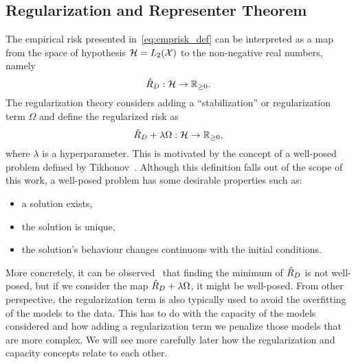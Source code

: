 \subsection{Regularization and Representer Theorem} %
The empirical risk presented in~\eqref{eq:emprisk_def} can be interpreted as a map from the space of hypothesis $\mathcal{H} = L_2(\mathcal{X})$ to the non-negative real numbers, namely
$$ \hat{R}_{D}: \mathcal{H} \to \mathbb{R}_{\geq 0} .$$
%
The regularization theory considers adding a ``stabilization'' or regularization term $\Omega$ and define the regularized risk as
$$ \hat{R}_{D} + \lambda \Omega: \mathcal{H} \to \mathbb{R}_{\geq 0} ,$$
where $\lambda$ is a hyperparameter.
This is motivated by the concept of a well-posed problem defined by Tikhonov~\citep{ScholkopfS02}. Although this definition falls out of the scope of this work, a well-posed problem has some desirable properties such as:
\begin{itemize}
    \item a solution exists,
    \item the solution is unique,
    \item the solution's behaviour changes continuous with the initial conditions.
\end{itemize} 
More concretely, it can be observed~\citep{ScholkopfS02} that finding the minimum of $\hat{R}_{D}$ is not well-posed, but if we consider the map $\hat{R}_{D} + \lambda \Omega$, it might be well-posed.
%
From other perspective, the regularization term is also typically used to avoid the overfitting of the models to the data. This has to do with the capacity of the models considered and how adding a regularization term we penalize those models that are more complex. We will see more carefully later how the regularization and capacity concepts relate to each other.
%

